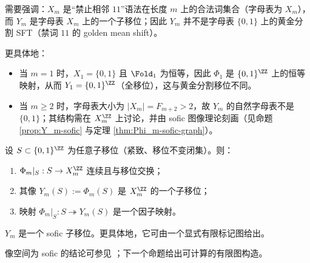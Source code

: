 \begin{remark}\label{rem:Ym-not-golden-mean}
需要强调：$X_m$ 是“禁止相邻 $11$”语法在长度 $m$ 上的合法词集合（字母表为 $X_m$），而 $Y_m$ 是字母表 $X_m$ 上的一个子移位；因此 $Y_m$ 并不是字母表 $\{0,1\}$ 上的黄金分割 SFT（禁词 $11$ 的 golden mean shift）。

更具体地：
\begin{itemize}
  \item 当 $m=1$ 时，$X_1=\{0,1\}$ 且 $\Fold_1$ 为恒等，因此 $\Phi_1$ 是 $\{0,1\}^{\ZZ}$ 上的恒等映射，从而 $Y_1=\{0,1\}^{\ZZ}$（全移位），这与黄金分割移位不同。
  \item 当 $m\ge 2$ 时，字母表大小为 $|X_m|=F_{m+2}>2$，故 $Y_m$ 的自然字母表不是 $\{0,1\}$；其结构需在 $X_m^{\ZZ}$ 上讨论，并由 sofic 图像理论刻画（见命题 \ref{prop:Y_m-sofic} 与定理 \ref{thm:Phi_m-sofic-graph}）。
\end{itemize}
\end{remark}

\begin{proposition}\label{prop:Phi_m-factor-on-subshift}
设 $S\subset\{0,1\}^{\ZZ}$ 为任意子移位（紧致、移位不变闭集）。则：
\begin{enumerate}
  \item $\Phi_m|_S:S\to X_m^{\ZZ}$ 连续且与移位交换；
  \item 其像 $Y_m(S):=\Phi_m(S)$ 是 $X_m^{\ZZ}$ 的一个子移位；
  \item 映射 $\Phi_m|_S:S\twoheadrightarrow Y_m(S)$ 是一个因子映射。
\end{enumerate}
\end{proposition}

\begin{proposition}\label{prop:Y_m-sofic}
$Y_m$ 是一个 sofic 子移位。更具体地，它可由一个显式有限标记图给出。
\end{proposition}
像空间为 sofic 的结论可参见 \cite{LindMarcus1995}；下一个命题给出可计算的有限图构造。
